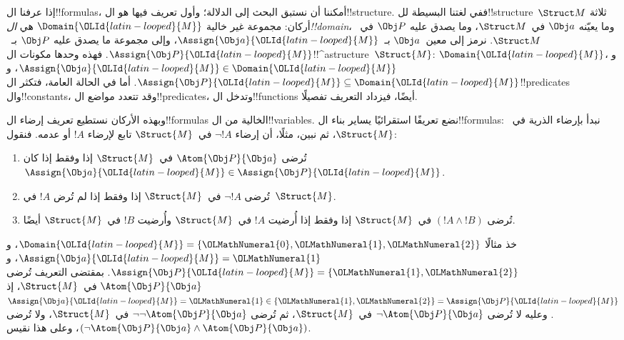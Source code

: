 \documentclass[../../../include/open-logic-section]{subfiles}
\begin{document}


إذا عرفنا ال!!{formula}s، أمكننا أن نستبق البحث إلى الدلالة؛ وأول
تعريف فيها هو ال!!{structure}. ففي لغتنا البسيطة لل!!{structure}~$\Struct M$
ثلاثة أركان: مجموعة غير خالية $\Domain{{\OLId{latin-looped}{M}}}$ هي
\emph{ال!!{domain}}، وما يعيّنه $\Obj a$ في~$\Struct M$، وما
يصدق عليه $\Obj P$ في~$\Struct M$. نرمز إلى معين~$\Obj a$
بـ~$\Assign{\Obj a}{{\OLId{latin-looped}{M}}}$، وإلى مجموعة ما يصدق عليه $\Obj P$
بـ~$\Assign{\Obj P}{{\OLId{latin-looped}{M}}}$. فهذه وحدها مكونات
ال!!^a{structure}~$\Struct{M}$: $\Domain{{\OLId{latin-looped}{M}}}$،
و$\Assign{\Obj a}{{\OLId{latin-looped}{M}}} \in \Domain{{\OLId{latin-looped}{M}}}$،
و$\Assign{\Obj P}{{\OLId{latin-looped}{M}}} \subseteq \Domain{{\OLId{latin-looped}{M}}}$. أما في الحالة العامة،
فتكثر ال!!{predicate}s وال!!{constant}s، وقد تتعدد مواضع
ال!!{predicate}s، وتدخل ال!!{function}s أيضًا، فيزداد التعريف
تفصيلًا.

وبهذه الأركان نستطيع تعريف إرضاء ال!!{formula}s الخالية من
ال!!{variable}s. نضع تعريفًا استقرائيًا يساير بناء ال!!{formula}s:
نبدأ بإرضاء الذرية في~$\Struct{M}$، ثم نبين، مثلًا، أن إرضاء
$\lnot !A$ في~$\Struct{M}$ تابع لإرضاء $!A$ أو عدمه. فنقول:

\begin{enumerate}
  \item تُرضى $\Atom{\Obj P}{\Obj a}$ في~$\Struct{M}$ إذا وفقط إذا
  كان $\Assign{\Obj a}{{\OLId{latin-looped}{M}}} \in \Assign{\Obj P}{{\OLId{latin-looped}{M}}}$.
  \item تُرضى $\lnot !A$ في~$\Struct{M}$ إذا وفقط إذا لم تُرض
  $!A$ في~$\Struct{M}$.
  \item تُرضى $(!A \land !B)$ في~$\Struct{M}$ إذا وفقط إذا أُرضيت
  $!A$ في~$\Struct{M}$ وأُرضيت $!B$ في~$\Struct{M}$ أيضًا.
\end{enumerate}
خذ مثالًا $\Domain{{\OLId{latin-looped}{M}}} = \{{\OLMathNumeral{0}}, {\OLMathNumeral{1}}, {\OLMathNumeral{2}}\}$،
و$\Assign{\Obj a}{{\OLId{latin-looped}{M}}} = {\OLMathNumeral{1}}$،
و$\Assign{\Obj P}{{\OLId{latin-looped}{M}}} = \{{\OLMathNumeral{1}}, {\OLMathNumeral{2}}\}$. بمقتضى التعريف تُرضى
$\Atom{\Obj P}{\Obj a}$ في~$\Struct{M}$، إذ
$\Assign{\Obj a}{{\OLId{latin-looped}{M}}} =  {\OLMathNumeral{1}} \in \{{\OLMathNumeral{1}},{\OLMathNumeral{2}}\} = \Assign{\Obj P}{{\OLId{latin-looped}{M}}}$.
وعليه لا تُرضى $\lnot \Atom{\Obj P}{\Obj a}$ في~$\Struct{M}$،
ثم تُرضى $\lnot\lnot \Atom{\Obj P}{\Obj a}$ في~$\Struct{M}$،
ولا تُرضى
$(\lnot \Atom{\Obj P}{\Obj a} \land \Atom{\Obj P}{\Obj a})$،
وعلى هذا نقيس.
\end{document}
